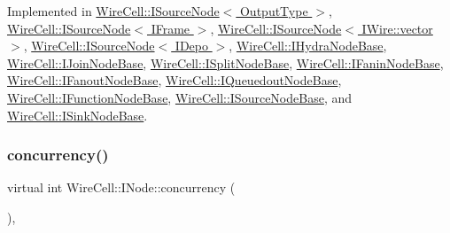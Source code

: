 Implemented in \hyperlink{class_wire_cell_1_1_i_source_node_a1742b49fa591d01cd209ed027a7d29ba}{Wire\+Cell\+::\+I\+Source\+Node$<$ Output\+Type $>$}, \hyperlink{class_wire_cell_1_1_i_source_node_a1742b49fa591d01cd209ed027a7d29ba}{Wire\+Cell\+::\+I\+Source\+Node$<$ I\+Frame $>$}, \hyperlink{class_wire_cell_1_1_i_source_node_a1742b49fa591d01cd209ed027a7d29ba}{Wire\+Cell\+::\+I\+Source\+Node$<$ I\+Wire\+::vector $>$}, \hyperlink{class_wire_cell_1_1_i_source_node_a1742b49fa591d01cd209ed027a7d29ba}{Wire\+Cell\+::\+I\+Source\+Node$<$ I\+Depo $>$}, \hyperlink{class_wire_cell_1_1_i_hydra_node_base_a92679ff7dc050dc051993655befae6c0}{Wire\+Cell\+::\+I\+Hydra\+Node\+Base}, \hyperlink{class_wire_cell_1_1_i_join_node_base_aa136f23e80aa3919612a3fd396b502f9}{Wire\+Cell\+::\+I\+Join\+Node\+Base}, \hyperlink{class_wire_cell_1_1_i_split_node_base_aae628151ca5604b24682381ba267dded}{Wire\+Cell\+::\+I\+Split\+Node\+Base}, \hyperlink{class_wire_cell_1_1_i_fanin_node_base_a1eadd634e7beaafcd7d0e93ea35a6f3b}{Wire\+Cell\+::\+I\+Fanin\+Node\+Base}, \hyperlink{class_wire_cell_1_1_i_fanout_node_base_a9532dcaebc70f1ecdfaf3526c32f8c40}{Wire\+Cell\+::\+I\+Fanout\+Node\+Base}, \hyperlink{class_wire_cell_1_1_i_queuedout_node_base_a45a6b7c8c0af34108868b9b4a0f2a8cf}{Wire\+Cell\+::\+I\+Queuedout\+Node\+Base}, \hyperlink{class_wire_cell_1_1_i_function_node_base_aea2adac35fc9aa54a82525ccb32471f7}{Wire\+Cell\+::\+I\+Function\+Node\+Base}, \hyperlink{class_wire_cell_1_1_i_source_node_base_adc531c3da5aa3192940e60390e683736}{Wire\+Cell\+::\+I\+Source\+Node\+Base}, and \hyperlink{class_wire_cell_1_1_i_sink_node_base_aed8e3945184e47177abf0b16c74e6aff}{Wire\+Cell\+::\+I\+Sink\+Node\+Base}.

\mbox{\label{class_wire_cell_1_1_i_node_a87d2b7293da4f6955e389ac6a2011306}} 
\subsubsection{\texorpdfstring{concurrency()}{concurrency()}}
{\footnotesize\ttfamily virtual int Wire\+Cell\+::\+I\+Node\+::concurrency (\begin{DoxyParamCaption}{ }\end{DoxyParamCaption})\hspace{0.3cm}{\ttfamily [inline]}, {\ttfamily [virtual]}}



